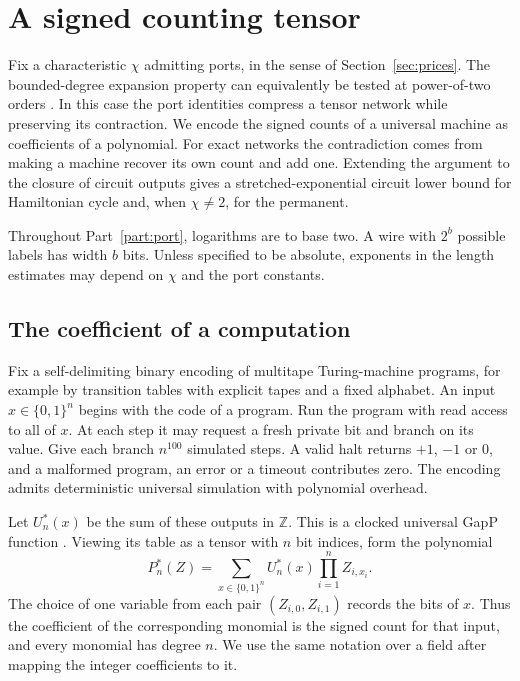\section{A signed counting tensor}\label{sec:model}

Fix a characteristic $\chi$ admitting ports, in the sense of
Section~\ref{sec:prices}. The bounded-degree expansion property can
equivalently be tested at power-of-two orders
\cite[Definition~ and the discussion there]{oaG}.
In this case the port identities compress a tensor network while
preserving its contraction. We encode the signed counts of a universal
machine as coefficients of a polynomial. For exact networks the
contradiction comes from making a machine recover its own count and
add one. Extending the argument to the closure of circuit outputs gives
a stretched-exponential circuit lower bound for Hamiltonian cycle and,
when $\chi\ne2$, for the permanent.

Throughout Part~\ref{part:port}, logarithms are to base two. A wire
with $2^b$ possible labels has width $b$ bits. Unless specified to be
absolute, exponents in the length estimates may depend on $\chi$ and
the port constants.

\subsection{The coefficient of a computation}

Fix a self-delimiting binary encoding of multitape Turing-machine
programs, for example by transition tables with explicit tapes and
a fixed alphabet. An input $x\in\{0,1\}^n$ begins with the code of a
program. Run the program with read access to all of $x$. At each
step it may request a fresh private bit and branch on its value.
Give each branch $n^{100}$ simulated steps. A valid halt returns
$+1$, $-1$ or $0$, and a malformed program, an error or a timeout
contributes zero. The encoding admits deterministic universal
simulation with polynomial overhead.

Let $U_n^*(x)$ be the sum of these outputs in $\mathbb Z$. This is a
clocked universal GapP function \cite{GapP}. Viewing its table as a
tensor with $n$ bit indices, form the polynomial
\begin{equation}\label{eq:signed-witness}
  P_n^*(Z)=\sum_{x\in\{0,1\}^n}U_n^*(x)\prod_{i=1}^n Z_{i,x_i}.
\end{equation}
The choice of one variable from each pair $(Z_{i,0},Z_{i,1})$
records the bits of $x$. Thus the coefficient of the corresponding
monomial is the signed count for that input, and every monomial
has degree $n$. We use the same notation over a field after mapping
the integer coefficients to it.

